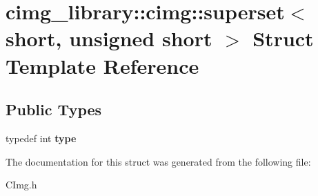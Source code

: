\hypertarget{structcimg__library_1_1cimg_1_1superset_3_01short_00_01unsigned_01short_01_4}{\section{cimg\-\_\-library\-:\-:cimg\-:\-:superset$<$ short, unsigned short $>$ Struct Template Reference}
\label{structcimg__library_1_1cimg_1_1superset_3_01short_00_01unsigned_01short_01_4}
}
\subsection*{Public Types}
\begin{DoxyCompactItemize}
\item 
\hypertarget{structcimg__library_1_1cimg_1_1superset_3_01short_00_01unsigned_01short_01_4_a53869b28a5652587c5f3f3c9ed7596ee}{typedef int {\bfseries type}}\label{structcimg__library_1_1cimg_1_1superset_3_01short_00_01unsigned_01short_01_4_a53869b28a5652587c5f3f3c9ed7596ee}

\end{DoxyCompactItemize}


The documentation for this struct was generated from the following file\-:\begin{DoxyCompactItemize}
\item 
C\-Img.\-h\end{DoxyCompactItemize}
